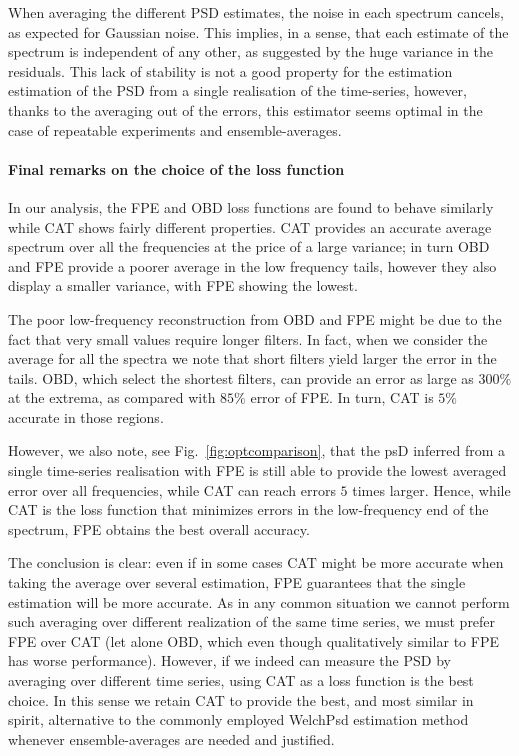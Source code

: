 \documentclass[twocolumn,showpacs,preprintnumbers,nofootinbib,prd,
superscriptaddress,10pt]{revtex4-1}
\begin{document}
When averaging the different PSD estimates, the noise in each spectrum cancels, as expected for Gaussian noise. 
This implies, in a sense, that each estimate of the spectrum is independent of any other, as suggested by the huge variance in the residuals. This lack of stability is not a good property for the estimation estimation of the PSD from a single realisation of the time-series, however, thanks to the averaging out of the errors, this estimator seems optimal in the case of repeatable experiments and ensemble-averages.

\paragraph{Final remarks on the choice of the loss function}

In our analysis, the FPE and OBD loss functions are found to behave similarly while CAT shows fairly different properties.
CAT provides an accurate average spectrum over all the frequencies at the price of a large variance; in turn OBD and FPE 
provide a poorer average in the low frequency tails, however they also display a  smaller variance, with FPE showing the lowest.

The poor low-frequency reconstruction from OBD and FPE might be due to the fact that very small values require longer filters. 
In fact, when we consider the average for all the spectra we note that short filters yield larger the error in the tails. OBD, which select the shortest filters, can provide an error as large as $300 \%$ at the extrema, as compared with $85\%$ error of FPE. In turn, CAT is $5\%$ accurate in those regions.

However, we also note, see Fig.~\ref{fig:optcomparison}, that the psD inferred from a single time-series realisation with FPE is still able 
to provide the lowest averaged error over all frequencies, while CAT can reach errors $5$ times larger.
Hence, while CAT is the loss function that minimizes errors in the low-frequency end of the spectrum, 
FPE obtains the best overall accuracy. 

The conclusion is clear: even if in some cases CAT might be more accurate when taking the average over several estimation, FPE guarantees that the single estimation will be more accurate.
As in any common situation we cannot perform such averaging over different realization of the same time series, we must prefer FPE over CAT (let alone OBD, which even though qualitatively similar to FPE has worse performance).
However, if we indeed can measure the PSD by averaging over different time series, using CAT as a loss function is the best choice. In this sense
we retain CAT to provide the best, and most similar in spirit, alternative to the commonly employed WelchPsd estimation method whenever 
ensemble-averages are needed and justified.
\end{document}

